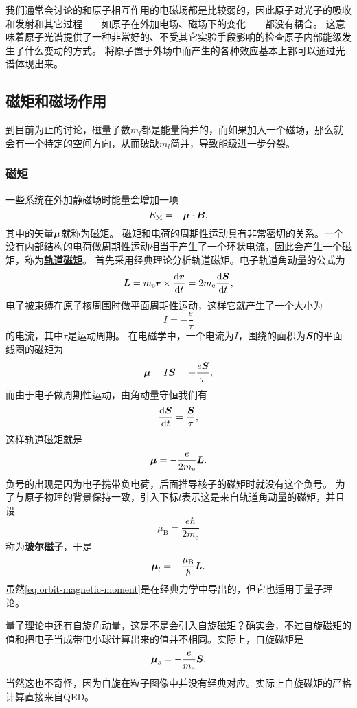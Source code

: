 \documentclass[UTF8, a4paper]{ctexart}
\newcommand*{\concept}[1]{\underline{\textbf{#1}}}
\begin{document}
我们通常会讨论的和原子相互作用的电磁场都是比较弱的，因此原子对光子的吸收和发射和其它过程——如原子在外加电场、磁场下的变化——都没有耦合。
这意味着原子光谱提供了一种非常好的、不受其它实验手段影响的检查原子内部能级发生了什么变动的方式。
将原子置于外场中而产生的各种效应基本上都可以通过光谱体现出来。

\subsection{磁矩和磁场作用}

到目前为止的讨论，磁量子数$m_l$都是能量简并的，而如果加入一个磁场，那么就会有一个特定的空间方向，从而破缺$m_l$简并，导致能级进一步分裂。

\subsubsection{磁矩}

一些系统在外加静磁场时能量会增加一项
\[
    E_\text{M} = - \vb*{\mu} \cdot \vb*{B},
\]
其中的矢量$\vb*{\mu}$就称为磁矩。
磁矩和电荷的周期性运动具有非常密切的关系。一个没有内部结构的电荷做周期性运动相当于产生了一个环状电流，因此会产生一个磁矩，称为\concept{轨道磁矩}。
首先采用经典理论分析轨道磁矩。电子轨道角动量的公式为
\[
    \vb*{L} = m_\text{e} \vb*{r} \times \dv{\vb*{r}}{t} = 2 m_\text{e} \dv{\vb*{S}}{t},
\]
电子被束缚在原子核周围时做平面周期性运动，这样它就产生了一个大小为
\[
    I = - \frac{e}{\tau}
\]
的电流，其中$\tau$是运动周期。
在电磁学中，一个电流为$I$，围绕的面积为$\vb*{S}$的平面线圈的磁矩为
\[
    \vb*{\mu} = I \vb*{S} = - \frac{e \vb*{S}}{\tau},
\]
而由于电子做周期性运动，由角动量守恒我们有
\[
    \dv{\vb*{S}}{t} = \frac{\vb*{S}}{\tau},
\]
这样轨道磁矩就是
\[
    \vb*{\mu} = - \frac{e}{2m_\text{e}} \vb*{L}.
\]
负号的出现是因为电子携带负电荷，后面推导核子的磁矩时就没有这个负号。
为了与原子物理的背景保持一致，引入下标$l$表示这是来自轨道角动量的磁矩，并且设
\begin{equation}
    \mu_\text{B} = \frac{e\hbar}{2m_\text{e}}
\end{equation}
称为\concept{玻尔磁子}，于是
\begin{equation}
    \vb*{\mu}_l = - \frac{\mu_\text{B}}{\hbar} \vb*{L}.
    \label{eq:orbit-magnetic-moment}
\end{equation}
虽然\eqref{eq:orbit-magnetic-moment}是在经典力学中导出的，但它也适用于量子理论。

量子理论中还有自旋角动量，这是不是会引入自旋磁矩？确实会，不过自旋磁矩的值和把电子当成带电小球计算出来的值并不相同。实际上，自旋磁矩是
\begin{equation}
    \vb*{\mu}_s = - \frac{e}{m_\text{e}} \vb*{S}.
\end{equation}
当然这也不奇怪，因为自旋在粒子图像中并没有经典对应。实际上自旋磁矩的严格计算直接来自QED。
\end{document}
